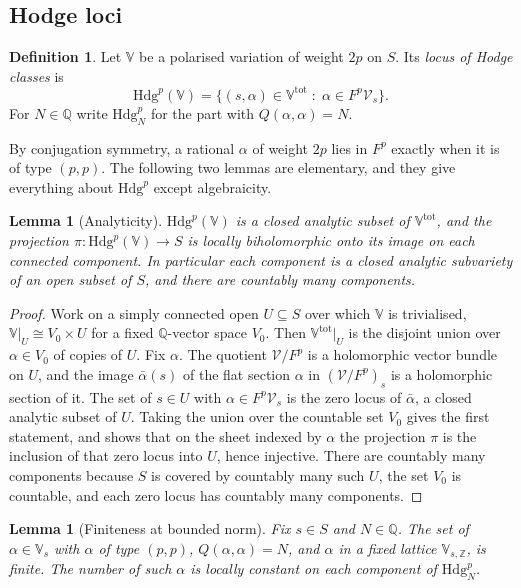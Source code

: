 \documentclass[11pt,reqno]{amsart}
\theoremstyle{plain}
\newtheorem{lemma}[theorem]{Lemma}
\theoremstyle{definition}
\newtheorem{definition}[theorem]{Definition}
\theoremstyle{remark}
\newcommand{\QQ}{\mathbb{Q}}
\newcommand{\ZZ}{\mathbb{Z}}
\newcommand{\cV}{\mathcal{V}}
\newcommand{\Hdg}{\mathrm{Hdg}}
\begin{document}
\subsection{Hodge loci}

\begin{definition}\label{def:hodgelocus}
Let $\mathbb{V}$ be a polarised variation of weight $2p$ on $S$. Its
\emph{locus of Hodge classes} is
\[
  \Hdg^{p}(\mathbb{V})
  =\bigl\{(s,\alpha)\in\mathbb{V}^{\mathrm{tot}}\;:\;
     \alpha\in F^{p}\cV_{s}\bigr\}.
\]
For $N\in\QQ$ write $\Hdg^{p}_{N}$ for the part with $Q(\alpha,\alpha)=N$.
\end{definition}

By conjugation symmetry, a rational $\alpha$ of weight $2p$ lies in $F^{p}$
exactly when it is of type $(p,p)$. The following two lemmas are elementary,
and they give everything about $\Hdg^{p}$ except algebraicity.

\begin{lemma}[Analyticity]\label{lem:hodgeanalytic}
$\Hdg^{p}(\mathbb{V})$ is a closed analytic subset of
$\mathbb{V}^{\mathrm{tot}}$, and the projection
$\pi\colon\Hdg^{p}(\mathbb{V})\to S$ is locally biholomorphic onto its image on
each connected component. In particular each component is a closed analytic
subvariety of an open subset of $S$, and there are countably many components.
\end{lemma}

\begin{proof}
Work on a simply connected open $U\subseteq S$ over which $\mathbb{V}$ is
trivialised, $\mathbb{V}|_{U}\cong V_{0}\times U$ for a fixed $\QQ$-vector
space $V_{0}$. Then $\mathbb{V}^{\mathrm{tot}}|_{U}$ is the disjoint union over
$\alpha\in V_{0}$ of copies of $U$. Fix $\alpha$. The quotient
$\cV/F^{p}$ is a holomorphic vector bundle on $U$, and the image
$\bar\alpha(s)$ of the flat section $\alpha$ in $(\cV/F^{p})_{s}$ is a
holomorphic section of it. The set of $s\in U$ with $\alpha\in F^{p}\cV_{s}$
is the zero locus of $\bar\alpha$, a closed analytic subset of $U$. Taking
the union over the countable set $V_{0}$ gives the first statement, and shows
that on the sheet indexed by $\alpha$ the projection $\pi$ is the inclusion of
that zero locus into $U$, hence injective. There are countably many
components because $S$ is covered by countably many such $U$, the set $V_{0}$
is countable, and each zero locus has countably many components.
\end{proof}

\begin{lemma}[Finiteness at bounded norm]\label{lem:boundednorm}
Fix $s\in S$ and $N\in\QQ$. The set of $\alpha\in\mathbb{V}_{s}$ with
$\alpha$ of type $(p,p)$, $Q(\alpha,\alpha)=N$, and $\alpha$ in a fixed
lattice $\mathbb{V}_{s,\ZZ}$, is finite. The number of such $\alpha$ is locally
constant on each component of $\Hdg^{p}_{N}$.
\end{lemma}
\end{document}

